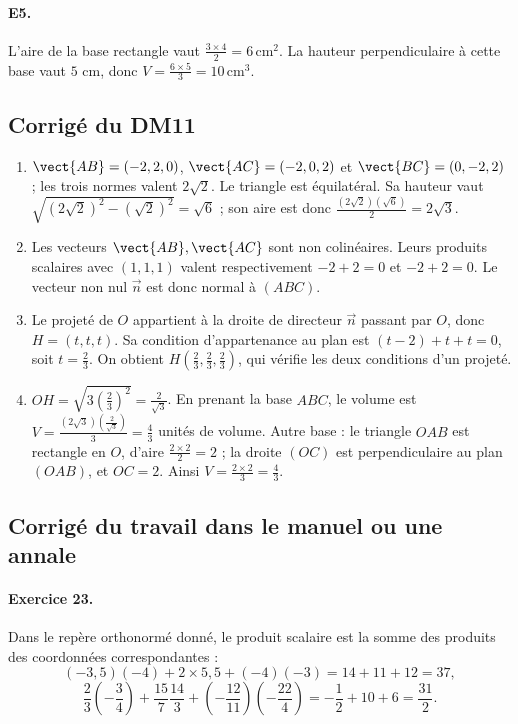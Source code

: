 \paragraph{E5.}L'aire de la base rectangle vaut $\frac{3\times4}{2}=6\,\mathrm{cm}^2$. La hauteur perpendiculaire à cette base vaut $5$ cm, donc $V=\frac{6\times5}{3}=10\,\mathrm{cm}^3$.

\subsection{Corrigé du DM11}\begin{enumerate}
\item $\vect{AB}=(-2,2,0)$, $\vect{AC}=(-2,0,2)$ et $\vect{BC}=(0,-2,2)$ ; les trois normes valent $2\sqrt2$. Le triangle est équilatéral. Sa hauteur vaut $\sqrt{(2\sqrt2)^2-(\sqrt2)^2}=\sqrt6$ ; son aire est donc $\frac{(2\sqrt2)(\sqrt6)}{2}=2\sqrt{3}$.
\item Les vecteurs $\vect{AB},\vect{AC}$ sont non colinéaires. Leurs produits scalaires avec $(1,1,1)$ valent respectivement $-2+2=0$ et $-2+2=0$. Le vecteur non nul $\vec n$ est donc normal à $(ABC)$.
\item Le projeté de $O$ appartient à la droite de directeur $\vec n$ passant par $O$, donc $H=(t,t,t)$. Sa condition d'appartenance au plan est $(t-2)+t+t=0$, soit $t=\frac{2}{3}$. On obtient $H(\frac{2}{3},\frac{2}{3},\frac{2}{3})$, qui vérifie les deux conditions d'un projeté.
\item $OH=\sqrt{3(\frac{2}{3})^2}=\frac{2}{\sqrt{3}}$. En prenant la base $ABC$, le volume est $V=\frac{(2\sqrt3)(\frac{2}{\sqrt{3}})}{3}=\frac{4}{3}$ unités de volume. Autre base : le triangle $OAB$ est rectangle en $O$, d'aire $\frac{2\times2}{2}=2$ ; la droite $(OC)$ est perpendiculaire au plan $(OAB)$, et $OC=2$. Ainsi $V=\frac{2\times2}{3}=\frac{4}{3}$.
\end{enumerate}

\subsection{Corrigé du travail dans le manuel ou une annale}\paragraph{Exercice 23.} Dans le repère orthonormé donné, le produit scalaire est la somme des produits des coordonnées correspondantes :
\[(-3{,}5)(-4)+2\times5{,}5+(-4)(-3)=14+11+12=37,\]
\[\frac23\left(-\frac34\right)+\frac{15}7\frac{14}3+\left(-\frac{12}{11}\right)\left(-\frac{22}4\right)=-\frac12+10+6=\frac{31}2.\]
